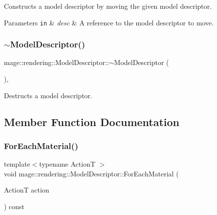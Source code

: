 Constructs a model descriptor by moving the given model descriptor.


\begin{DoxyParams}[1]{Parameters}
\mbox{\tt in}  & {\em desc} & A reference to the model descriptor to move. \\
\hline
\end{DoxyParams}
\hypertarget{classmage_1_1rendering_1_1_model_descriptor_adef21799bc748828e8e04bc74f86aac0}{}\label{classmage_1_1rendering_1_1_model_descriptor_adef21799bc748828e8e04bc74f86aac0} 
\subsubsection{\texorpdfstring{$\sim$\+Model\+Descriptor()}{~ModelDescriptor()}}
{\footnotesize\ttfamily mage\+::rendering\+::\+Model\+Descriptor\+::$\sim$\+Model\+Descriptor (\begin{DoxyParamCaption}{ }\end{DoxyParamCaption})\hspace{0.3cm}{\ttfamily [virtual]}, {\ttfamily [default]}}

Destructs a model descriptor. 

\subsection{Member Function Documentation}
\hypertarget{classmage_1_1rendering_1_1_model_descriptor_adb6b348af57fed57e36b094a1dc59cd0}{}\label{classmage_1_1rendering_1_1_model_descriptor_adb6b348af57fed57e36b094a1dc59cd0} 
\subsubsection{\texorpdfstring{For\+Each\+Material()}{ForEachMaterial()}}
{\footnotesize\ttfamily template$<$typename ActionT $>$ \\
void mage\+::rendering\+::\+Model\+Descriptor\+::\+For\+Each\+Material (\begin{DoxyParamCaption}\item[{ActionT}]{action }\end{DoxyParamCaption}) const}

